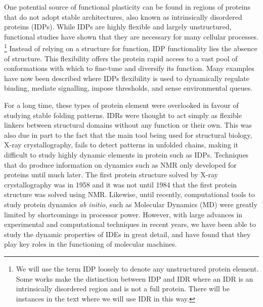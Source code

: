 One potential source of functional plasticity can be found in regions of proteins that do not adopt stable architectures, also known as intrinsically disordered proteins (IDPs). While IDPs are highly flexible and largely unstructured, functional studies have shown that they are necessary for many cellular processes.  \footnote{We will use the term IDP loosely to denote any unstructured protein element. Some works make the distinction between IDP and IDR where an IDR is an intrinsically disordered region and is not a full protein. There will be instances in the text where we will use IDR in this way.} Instead of relying on a structure for function, IDP functionality lies the absence of structure. This flexibility offers the protein rapid access to a vast pool of conformations with which to fine-tune and diversify its function. Many examples have now been described where IDPs flexibility is used to dynamically regulate binding, mediate signalling, impose thresholds, and sense environmental queues. 


For a long time, these types of protein element were overlooked in favour of studying stable folding patterns. IDRs were thought to act simply as flexible linkers between structural domains without any  function or their own. This was also due in part to the fact that the main tool being used for structural biology, X-ray crystallography, fails to detect patterns in unfolded chains, making it difficult to study highly dynamic elements in protein such as IDPs. Techniques that do produce information on dynamics such as NMR only developed for proteins until much later. The first protein structure solved by X-ray crystallography was in 1958 and it was not until 1984 that the first protein structure was solved using NMR. Likewise, until recently, computational tools to study protein dynamics {\it ab initio}, such as Molecular Dynamics (MD) were greatly limited by shortcomings in processor power. However, with large advances in experimental and computational techniques in recent years, we have been able to study the dynamic properties of IDEs in great detail, and have found that they play key roles in the functioning of molecular machines. 



